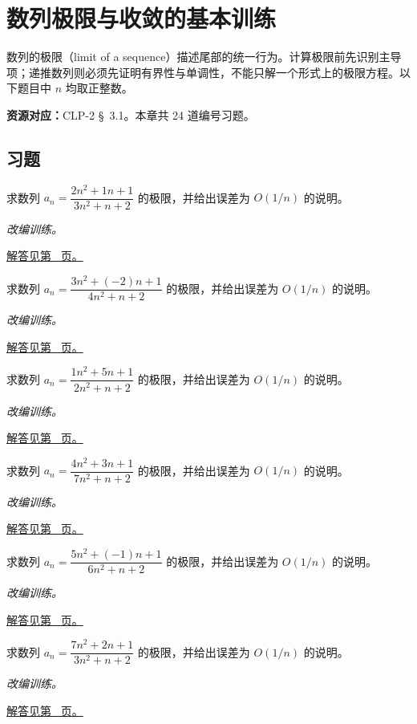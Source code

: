 \documentclass[UTF8,12pt,a4paper,fontset=fandol]{ctexart}
\begin{document}
\section{数列极限与收敛的基本训练}\label{sec:ch1}
数列的极限（limit of a sequence）描述尾部的统一行为。计算极限前先识别主导项；递推数列则必须先证明有界性与单调性，不能只解一个形式上的极限方程。以下题目中 $n$ 均取正整数。

\textbf{资源对应：}CLP-2 \S~3.1。本章共 24 道编号习题。
\subsection{习题}
\begin{example}[同阶多项式的比]\label{ex:c1q1}
求数列 $a_n=\dfrac{2n^2+1n+1}{3n^2+n+2}$ 的极限，并给出误差为 $O(1/n)$ 的说明。
\par\textit{改编训练。}\par\hyperref[ans:c1q1]{解答见第~\pageref{ans:c1q1} 页。}
\end{example}
\begin{example}[同阶多项式的比]\label{ex:c1q2}
求数列 $a_n=\dfrac{3n^2+(-2)n+1}{4n^2+n+2}$ 的极限，并给出误差为 $O(1/n)$ 的说明。
\par\textit{改编训练。}\par\hyperref[ans:c1q2]{解答见第~\pageref{ans:c1q2} 页。}
\end{example}
\begin{example}[同阶多项式的比]\label{ex:c1q3}
求数列 $a_n=\dfrac{1n^2+5n+1}{2n^2+n+2}$ 的极限，并给出误差为 $O(1/n)$ 的说明。
\par\textit{改编训练。}\par\hyperref[ans:c1q3]{解答见第~\pageref{ans:c1q3} 页。}
\end{example}
\begin{example}[同阶多项式的比]\label{ex:c1q4}
求数列 $a_n=\dfrac{4n^2+3n+1}{7n^2+n+2}$ 的极限，并给出误差为 $O(1/n)$ 的说明。
\par\textit{改编训练。}\par\hyperref[ans:c1q4]{解答见第~\pageref{ans:c1q4} 页。}
\end{example}
\begin{example}[同阶多项式的比]\label{ex:c1q5}
求数列 $a_n=\dfrac{5n^2+(-1)n+1}{6n^2+n+2}$ 的极限，并给出误差为 $O(1/n)$ 的说明。
\par\textit{改编训练。}\par\hyperref[ans:c1q5]{解答见第~\pageref{ans:c1q5} 页。}
\end{example}
\begin{example}[同阶多项式的比]\label{ex:c1q6}
求数列 $a_n=\dfrac{7n^2+2n+1}{3n^2+n+2}$ 的极限，并给出误差为 $O(1/n)$ 的说明。
\par\textit{改编训练。}\par\hyperref[ans:c1q6]{解答见第~\pageref{ans:c1q6} 页。}
\end{example}
\end{document}

